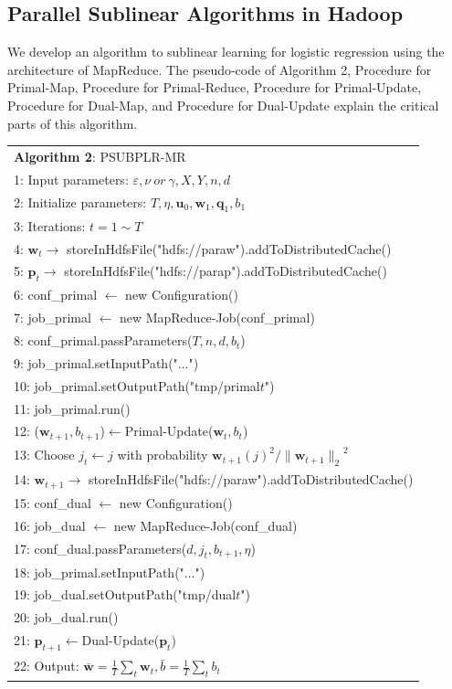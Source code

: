 \documentclass[10pt, conference, compsocconf]{IEEEtran}
\newcommand{\bw}{\mathbf{w}}
\newcommand{\bp}{\mathbf{p}}
\newcommand{\bq}{\mathbf{q}}
\newcommand{\lc}{\left(}
\newcommand{\rc}{\right)}
\newcommand{\lj}{\lc j\rc}
\newcommand{\tspace}{\hspace*{2em}}
\newcommand{\tspaces}{\hspace*{1.5em}}
\begin{document}
\subsection{Parallel Sublinear Algorithms in Hadoop}
We develop an algorithm to sublinear learning for logistic regression using the architecture of MapReduce.
The pseudo-code of Algorithm 2, Procedure for Primal-Map, Procedure for Primal-Reduce, Procedure for Primal-Update, Procedure for Dual-Map, and Procedure for Dual-Update explain the critical parts of this algorithm.
	\begin{table}[ht]
	\begin{tabular}{l}
	\hline\noalign{\smallskip}
	\textbf{Algorithm 2}: PSUBPLR-MR \\
	\noalign{\smallskip}
	\hline
	\noalign{\smallskip}
    1:  Input parameters: $\varepsilon, \nu~or~\gamma, X, Y, n, d$ \\
    2:	Initialize parameters: $T, \eta, {\mathbf{u}}_{0}, {\bw}_{1}, {\mathbf{\bq}}_{1}, {b}_{1}$\\
    3:	Iterations: $t=1 \sim T$ \\
    4:  \tspace $\bw_t \rightarrow$ storeInHdfsFile("hdfs://paraw").addToDistributedCache() \\
    5:  \tspace $\bp_t \rightarrow$ storeInHdfsFile("hdfs://parap").addToDistributedCache() \\
    6:  \tspace conf\_primal $\leftarrow$ new Configuration() \\
    7:  \tspace job\_primal $\leftarrow$ new MapReduce-Job(conf\_primal) \\
    8:  \tspace conf\_primal.passParameters($T, n, d, b_t$) \\
    9:  \tspace job\_primal.setInputPath("...") \\
	10:	\tspaces job\_primal.setOutputPath("tmp/primal$t$") \\
    11: \tspaces job\_primal.run() \\
    12: \tspaces ($\bw_{t+1}, b_{t+1}$)$\leftarrow$Primal-Update($\bw_t, b_t$) \\
    13: \tspaces Choose $j_t \leftarrow j$ with probability ${{\bw}_{t+1}\lj}^{2}/{\|{\bw}_{t+1}\|_2}^{2} $ \\
    14: \tspaces $\bw_{t+1} \rightarrow$ storeInHdfsFile("hdfs://paraw").addToDistributedCache() \\
    15: \tspaces conf\_dual $\leftarrow$ new Configuration() \\
    16: \tspaces job\_dual $\leftarrow$ new MapReduce-Job(conf\_dual) \\
    17: \tspaces conf\_dual.passParameters($d, j_t, b_{t+1}, \eta$) \\
    18: \tspaces job\_primal.setInputPath("...") \\	
    19:	\tspaces job\_dual.setOutputPath("tmp/dual$t$") \\
    20: \tspaces job\_dual.run() \\	
    21: \tspaces $\bp_{t+1}\leftarrow$Dual-Update($\bp_t$) \\
    22: Output: $\bar{\bw}=\frac{1}{T}\sum_{t}{\bw}_{t},\bar{b}=\frac{1}{T}\sum_{t}{b}_{t}$ \\
	\hline
	\end{tabular}
	\end{table}
\end{document}
